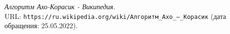 \begin{thebibliography}{99}
{\itshape Алгоритм Ахо-Корасик - Википедия.} \\URL: \texttt{https://ru.wikipedia.org/wiki/Алгоритм\_Ахо\_—\_Корасик} (дата обращения: 25.05.2022).
\end{thebibliography}
\pagebreak


